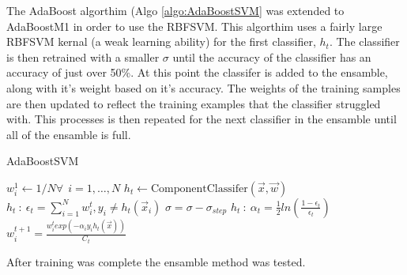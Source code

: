 The AdaBoost algorthim (Algo \ref{algo:AdaBoostSVM} was extended to AdaBoostM1 in order to use the RBFSVM.
This algorthim uses a fairly large RBFSVM kernal (a weak learning ability) for the first classifier, $h_t$.
The classifier is then retrained with a smaller $\sigma$ until the accuracy of the classifier has an accuracy of just over 50\%.
At this point the classifer is added to the ensamble, along with it's weight based on it's accuracy.
The weights of the training samples are then updated to reflect the training examples that the classifier struggled with.
This processes is then repeated for the next classifier in the ensamble until all of the ensamble is full.
\begin{algorithm}
\caption{AdaBoostSVM}
\label{algo:AdaBoostSVM}
\begin{algorithmic}[1]
\State $w_{i}^{1} \gets 1/N \forall ~~ i=1,\dots,N$
    \label{marker}
    \State $h_t \gets \text{ComponentClassifer}(\vec{x},\vec{w})$
    \State $h_t~:~\epsilon_t = \sum_{i=1}^{N}w_{i}^{t} , y_i \ne h_t(\vec{x}_i)$
        \State $\sigma = \sigma - \sigma_{step}$
        \State {}
    \EndIf
    \State $h_t~:~\alpha_t = \frac{1}{2} ln\left ( \frac{1-\epsilon_t}{\epsilon_t}\right)$
    \State $w_i^{t+1} = \frac{w_i^{t} exp\left ( -\alpha_i y_i h_t(\vec{x})\right)}{C_t}$
\EndWhile
{}
\EndProcedure
\end{algorithmic}
\end{algorithm}

After training was complete the ensamble method was tested.
